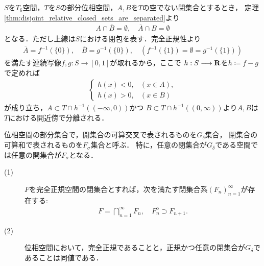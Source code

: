 	\begin{prf}
		$S$を$T_6$空間，$T$を$S$の部分位相空間，$A,B$を$T$の空でない閉集合とするとき，
		定理\ref{thm:disjoint_relative_closed_sets_are_separated}より
		\begin{align}
			A \cap \overline{B} = \emptyset,\quad \overline{A} \cap B = \emptyset
		\end{align}
		となる．ただし上線は$S$における閉包を表す．完全正規性より
		\begin{align}
			\overline{A} = f^{-1}(\{0\}),
			\quad \overline{B} = g^{-1}(\{0\}),
			\quad \left( f^{-1}(\{1\}) = \emptyset = g^{-1}(\{1\}) \right)
		\end{align}
		を満たす連続写像$f,g:S \longrightarrow [0,1]$が取れるから，ここで
		$h:S \longrightarrow \mathbf{R}$を$h \coloneqq f - g$で定めれば
		\begin{align}
			\begin{cases}
				h(x) < 0, & (x \in A), \\
				h(x) > 0, & (x \in B)
			\end{cases}
		\end{align}
		が成り立ち，$A \subset T \cap h^{-1}((-\infty,0))$かつ
		$B \subset T \cap h^{-1}((0,\infty))$より$A,B$は$T$における開近傍で分離される．
		\QED
	\end{prf}
	
	\begin{screen}
		\begin{dfn}
			位相空間の部分集合で，開集合の可算交叉で表されるものを$G_\delta$集合，
			閉集合の可算和で表されるものを$F_\sigma$集合と呼ぶ．
			特に，任意の閉集合が$G_\delta$である空間では任意の開集合が$F_\sigma$となる．
		\end{dfn}
	\end{screen}
	
	\begin{screen}
		\begin{thm}
		\label{thm:perfectly_normal_Hausdorff_is_normal_and_closed_is_G_delta}\mbox{}
			\begin{description}
				\item[(1)]
					$F$を完全正規空間の閉集合とすれば，次を満たす閉集合系$(F_n)_{n=1}^\infty$が存在する:
					\begin{align}
						F = \bigcap_{n=1}^\infty F_n,
						\quad F_n^{\mathrm{o}} \supset F_{n+1}. 
					\end{align}
					
				\item[(2)]
					位相空間において，完全正規であることと，正規かつ任意の閉集合が$G_\delta$であることは同値である．
			\end{description}
		\end{thm}
	\end{screen}
	
